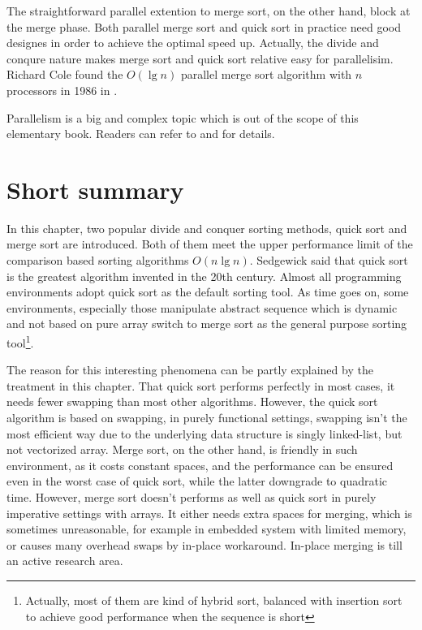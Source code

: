 \documentclass[UTF8]{article}
\begin{document}
The straightforward parallel extention to merge sort, on the other hand, block
at the merge phase. Both parallel merge sort and quick sort in practice need
good designes in order to achieve the optimal speed up. Actually, the divide and
conqure nature makes merge sort and quick sort relative easy for parallelisim.
Richard Cole found the $O(\lg n)$ parallel merge sort algorithm with $n$ processors
in 1986 in \cite{para-msort}.

Parallelism is a big and complex
topic which is out of the scope of this elementary book. Readers can refer to
\cite{para-msort} and \cite{para-qsort} for details.

\section{Short summary}
In this chapter, two popular divide and conquer sorting methods, quick sort and merge sort are introduced.
Both of them meet the upper performance limit of the comparison based sorting algorithms $O(n \lg n)$.
Sedgewick said that quick sort is the greatest algorithm invented in the 20th century. Almost
all programming environments adopt quick sort as the default sorting tool. As time goes on,
some environments, especially those manipulate abstract sequence which is dynamic and not based on
pure array switch to merge sort as the general purpose sorting tool\footnote{Actually, most of
them are kind of hybrid sort, balanced with insertion sort to achieve good performance when the
sequence is short}.

The reason for this interesting phenomena can be partly explained by the treatment in this chapter.
That quick sort performs perfectly in most cases, it needs fewer swapping than most other algorithms.
However, the quick sort algorithm is based on swapping, in purely functional settings, swapping isn't
the most efficient way due to the underlying data structure is singly linked-list, but not vectorized
array. Merge sort, on the other hand, is friendly in such environment, as it costs constant spaces,
and the performance can be ensured even in the worst case of quick sort, while the latter downgrade
to quadratic time. However, merge sort doesn't performs as well as quick sort in purely imperative
settings with arrays. It either needs extra spaces for merging, which is sometimes unreasonable, for
example in embedded system with limited memory, or causes many overhead swaps by in-place workaround.
In-place merging is till an active research area.
\end{document}
